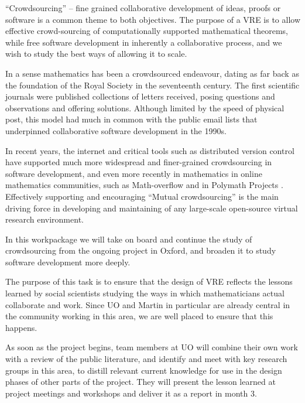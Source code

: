 \begin{workpackage}[id=social-aspects,wphases=0-48,
  title=Social Aspects,
  lead=UO,
  UORM=23,USHRM=18,USORM=6]
\begin{wpdescription}

``Crowdsourcing'' -- fine grained collaborative development of ideas,
  proofs or software is a common theme to both objectives. The purpose
  of a VRE is to allow effective crowd-sourcing of computationally
  supported mathematical theorems, while free software development in
  inherently a collaborative process, and we wish to study the best
  ways of allowing it to scale.

  In a sense mathematics has been a crowdsourced endeavour, dating as
  far back as the foundation of the Royal Society in the seventeenth
  century.  The first scientific journals were published collections
  of letters received, posing questions and observations and offering
  solutions.  Although limited by the speed of physical post, this
  model had much in common with the public email lists that
  underpinned collaborative software development in the 1990s.

In recent years, the internet and critical tools such as distributed
version control have supported much more widespread and finer-grained
crowdsourcing in software development, and even more recently in
mathematics in online mathematics communities, such as Math-overflow
\cite{mathoverflow} and in Polymath Projects \cite{polymath_SIAM,
  PolymathBlog}.  Effectively supporting and encouraging ``Mutual
crowdsourcing'' is the main driving force in developing and
maintaining of any large-scale open-source virtual research
environment.

In this workpackage we will take on board and continue the study of
crowdsourcing from the ongoing project in Oxford, and broaden it to
study software development more deeply.

\end{wpdescription}

\begin{tasklist}
\begin{task}[title=Social Science Input to
    Design,id=social-input,lead=UO,PM=18, partners={UO,PS}]
The purpose of this task is to ensure that the design of \TheProject
VRE reflects the lessons learned by social scientists studying the
ways in which mathematicians actual collaborate and work. Since UO and
Martin in particular are already central in the community
working in this area, we are well placed to ensure that this happens. 

As soon as the project begins, team members at UO will combine their
own work with a review of the public literature, and identify and
meet with key research groups in this area, to distill relevant
current knowledge for use in the design phases of other parts of the
project. They will  present the lesson
learned at project meetings and workshops and deliver it as a report
 in month 3.


\end{task}
\end{tasklist}
\end{workpackage}
